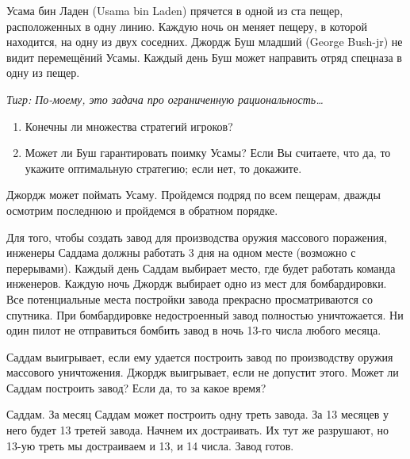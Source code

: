 \begin{problem}\par

Усама бин Ладен (Usama bin Laden) прячется в одной из ста пещер, расположенных в одну линию. Каждую ночь он меняет пещеру, в которой находится, на одну из двух соседних. Джордж Буш младший (George Bush-jr) не видит перемещёний Усамы. Каждый день Буш может направить отряд спецназа в одну из пещер. \par

{\it Тигр: По-моему, это задача про ограниченную рациональность\ldots }\par
\begin{enumerate}
\item 	Конечны ли множества стратегий игроков?\par
\item		Может ли Буш гарантировать поимку Усамы? Если Вы считаете, что да, то укажите оптимальную стратегию; если нет, то докажите.
\end{enumerate}


\begin{sol}
Джордж может поймать Усаму. Пройдемся подряд по всем пещерам, дважды осмотрим последнюю и пройдемся в обратном порядке.
\end{sol}
\end{problem}







\begin{problem}\par

Для того, чтобы создать завод для производства оружия массового поражения, инженеры Саддама должны работать 3 дня на одном месте (возможно с перерывами). Каждый день Саддам выбирает место, где будет работать команда инженеров. Каждую ночь Джордж выбирает одно из мест для бомбардировки. Все потенциальные места постройки завода прекрасно просматриваются со спутника. При бомбардировке недостроенный завод полностью уничтожается. Ни один пилот не отправиться бомбить завод в ночь 13-го числа любого месяца. %

Саддам выигрывает, если ему удается построить завод по производству оружия массового уничтожения. Джордж выигрывает, если не допустит этого. Может ли Саддам построить завод? Если да, то за какое время?



\begin{sol}
Саддам. За месяц Саддам может построить одну треть завода. За 13 месяцев у него будет 13 третей завода. Начнем их достраивать. Их тут же разрушают, но 13-ую треть мы достраиваем и 13, и 14 числа. Завод готов.
\end{sol}
\end{problem}






